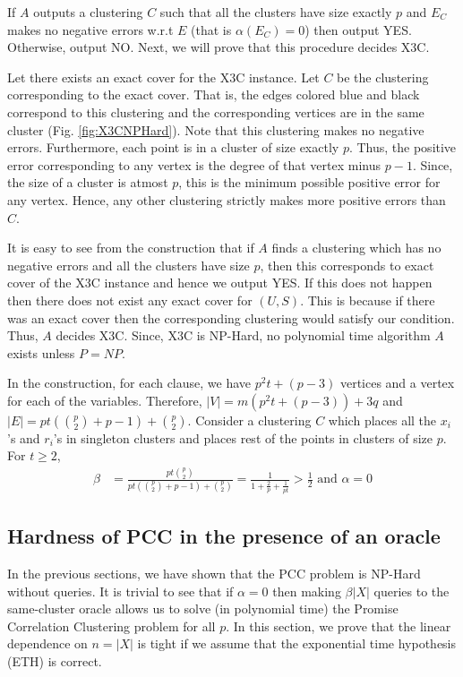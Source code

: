 \documentclass[12pt]{article}
\begin{document}
If $A$ outputs a clustering $C$ such that all the clusters have size exactly $p$ and $E_C$ makes no negative errors w.r.t $E$ (that is $\alpha(E_C) = 0$) then output YES. Otherwise, output NO. Next, we will prove that this procedure decides X3C. 

Let there exists an exact cover for the X3C instance. Let $C$ be the clustering corresponding to the exact cover. That is, the edges colored blue and black correspond to this clustering and the corresponding vertices are in the same cluster (Fig. \ref{fig:X3CNPHard}). Note that this clustering makes no negative errors. Furthermore, each point is in a cluster of size exactly $p$. Thus, the positive error corresponding to any vertex is the degree of that vertex minus $p-1$. Since, the size of a cluster is atmost $p$, this is the minimum possible positive error for any vertex. Hence, any other clustering strictly makes more positive errors than $C$. 

It is easy to see from the construction that if $A$ finds a clustering which has no negative errors and all the clusters have size $p$, then this corresponds to exact cover of the X3C instance and hence we output YES. If this does not happen then there does not exist any exact cover for $(U, S)$. This is because if there was an exact cover then the corresponding clustering would satisfy our condition. Thus, $A$ decides X3C. Since, X3C is NP-Hard, no polynomial time algorithm $A$ exists unless $P = NP$.

In the construction, for each clause, we have $p^2 t + (p - 3)$ vertices and a vertex for each of the variables. Therefore, $|V| = m (p^2 t + (p-3)) + 3q$ and $|E| = pt({p \choose 2}+p-1) + {p \choose 2}$.  Consider a clustering $C$ which places all the $x_i$'s  and $r_i$'s in singleton clusters and places rest of the points in clusters of size $p$. For $t \ge 2$,
\begin{align*}
  \beta &= \frac{pt{p \choose 2}}{pt({p \choose 2}+p-1) + {p \choose 2}} = \frac{1}{1 + \frac{2}{p} + \frac{1}{pt}} > \frac{1}{2} \text{ and }\alpha = 0
\end{align*} 

\subsection{Hardness of PCC in the presence of an oracle}
\label{section:PCCNPHardOracle}
In the previous sections, we have shown that the PCC problem is NP-Hard without queries. It is trivial to see that if $\alpha = 0$ then making $\beta |X|$ queries to the same-cluster oracle allows us to solve (in polynomial time) the Promise Correlation Clustering problem for all $p$. In this section, we prove that the linear dependence on $n = |X|$ is tight if we assume that the exponential time hypothesis (ETH) is correct. 
\end{document}
